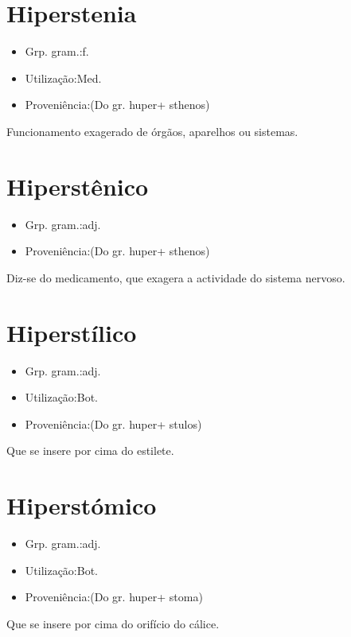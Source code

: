 \documentclass{article}
\begin{document}
\section{Hiperstenia}
\begin{itemize}
\item {Grp. gram.:f.}
\end{itemize}
\begin{itemize}
\item {Utilização:Med.}
\end{itemize}
\begin{itemize}
\item {Proveniência:(Do gr. \textunderscore huper\textunderscore  + \textunderscore sthenos\textunderscore )}
\end{itemize}
Funcionamento exagerado de órgãos, aparelhos ou sistemas.
\section{Hiperstênico}
\begin{itemize}
\item {Grp. gram.:adj.}
\end{itemize}
\begin{itemize}
\item {Proveniência:(Do gr. \textunderscore huper\textunderscore  + \textunderscore sthenos\textunderscore )}
\end{itemize}
Diz-se do medicamento, que exagera a actividade do sistema nervoso.
\section{Hiperstílico}
\begin{itemize}
\item {Grp. gram.:adj.}
\end{itemize}
\begin{itemize}
\item {Utilização:Bot.}
\end{itemize}
\begin{itemize}
\item {Proveniência:(Do gr. \textunderscore huper\textunderscore  + \textunderscore stulos\textunderscore )}
\end{itemize}
Que se insere por cima do estilete.
\section{Hiperstómico}
\begin{itemize}
\item {Grp. gram.:adj.}
\end{itemize}
\begin{itemize}
\item {Utilização:Bot.}
\end{itemize}
\begin{itemize}
\item {Proveniência:(Do gr. \textunderscore huper\textunderscore  + \textunderscore stoma\textunderscore )}
\end{itemize}
Que se insere por cima do orifício do cálice.
\end{document}
